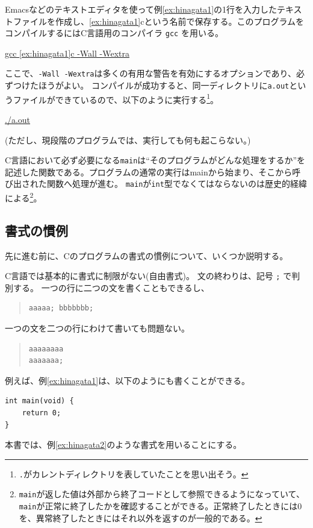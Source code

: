 Emacsなどのテキストエディタを使って例\ref{ex:hinagata1}の1行を入力したテキストファイルを作成し、\ref{ex:hinagata1}cという名前で保存する。このプログラムをコンパイルするにはC言語用のコンパイラ \texttt{gcc} を用いる。
\begin{commandline2}
    \prompt \underline{gcc \ref{ex:hinagata1}c -Wall -Wextra}
\end{commandline2} \noindent
ここで、\texttt{-Wall -Wextra}は多くの有用な警告を有効にするオプションであり、必ずつけたほうがよい。
コンパイルが成功すると、同一ディレクトリに\texttt{a.out}というファイルができているので、以下のように実行する\footnote{\texttt{.}がカレントディレクトリを表していたことを思い出そう。}。
\begin{commandline2}
    \prompt \underline{./a.out}
\end{commandline2} \noindent
(ただし、現段階のプログラムでは、実行しても何も起こらない。)

C言語において必ず必要になる\texttt{main}は``そのプログラムがどんな処理をするか''を記述した関数である。プログラムの通常の実行はmainから始まり、そこから呼び出された関数へ処理が進む。
\texttt{main}が\texttt{int}型でなくてはならないのは歴史的経緯による\footnote{\texttt{main}が返した値は外部から終了コードとして参照できるようになっていて、\texttt{main}が正常に終了したかを確認することができる。正常終了したときには0を、異常終了したときにはそれ以外を返すのが一般的である。}。

\subsection{書式の慣例}

先に進む前に、Cのプログラムの書式の慣例について、いくつか説明する。

C言語では基本的に書式に制限がない(自由書式)。
文の終わりは、記号 \texttt{;} で判別する。
一つの行に二つの文を書くこともできるし、
\begin{quote}
\begin{verbatim}
aaaaa; bbbbbbb;
\end{verbatim}
\end{quote}
一つの文を二つの行にわけて書いても問題ない。
\begin{quote}
\begin{verbatim}
aaaaaaaa
aaaaaaa;
\end{verbatim}
\end{quote}
例えば、例\ref{ex:hinagata1}は、以下のようにも書くことができる。
\begin{reidai}\label{ex:hinagata2}
    \begin{verbatim}
int main(void) {
    return 0;
}
\end{verbatim}
\end{reidai} \noindent
本書では、例\ref{ex:hinagata2}のような書式を用いることにする。

